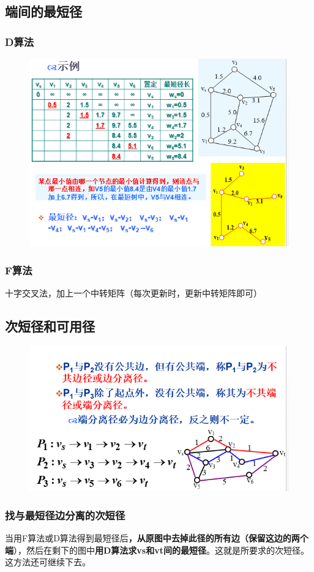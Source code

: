 \subsection{端间的最短径}
\subsubsection{D算法}
\begin{figure}[H]
	\centering
	\includegraphics[width=0.7\linewidth]{figures/screenshot071}
	\caption{}
	\label{fig:screenshot071}
\end{figure}
\subsubsection{F算法}
十字交叉法，加上一个中转矩阵（每次更新时，更新中转矩阵即可）
\subsection{次短径和可用径
}
\begin{figure}[H]
	\centering
	\includegraphics[width=0.7\linewidth]{figures/screenshot072}
	\caption{}
	\label{fig:screenshot072}
\end{figure}
\subsubsection{找与最短径边分离的次短径}
当用F算法或D算法得到最短径后\textbf{，从原图中去掉此径的所有边（保留这边的两个端}），然后在剩下的图中\textbf{用D算法求vs和vt间的最短径}。这就是所要求的次短径。这方法还可继续下去。
